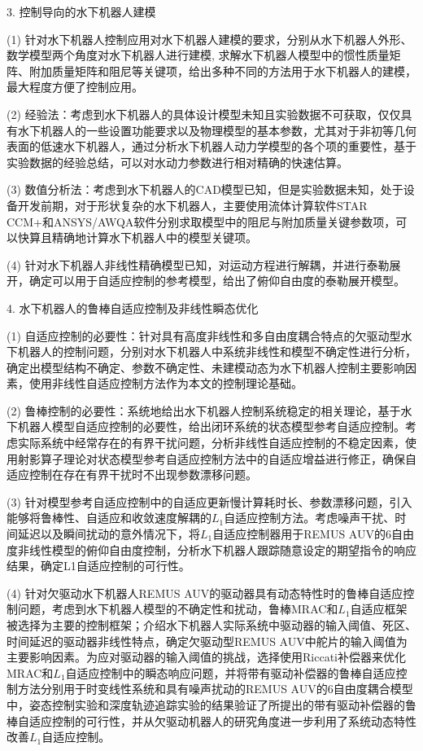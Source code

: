3. 控制导向的水下机器人建模

(1) 针对水下机器人控制应用对水下机器人建模的要求，分别从水下机器人外形、数学模型两个角度对水下机器人进行建模, 求解水下机器人模型中的惯性质量矩阵、附加质量矩阵和阻尼等关键项，给出多种不同的方法用于水下机器人的建模，最大程度方便了控制应用。

(2) 经验法：考虑到水下机器人的具体设计模型未知且实验数据不可获取，仅仅具有水下机器人的一些设置功能要求以及物理模型的基本参数，尤其对于非初等几何表面的低速水下机器人，通过分析水下机器人动力学模型的各个项的重要性，基于实验数据的经验总结，可以对水动力参数进行相对精确的快速估算。

(3) 数值分析法：考虑到水下机器人的CAD模型已知，但是实验数据未知，处于设备开发前期，对于形状复杂的水下机器人，主要使用流体计算软件STAR CCM+和ANSYS/AWQA软件分别求取模型中的阻尼与附加质量关键参数项，可以快算且精确地计算水下机器人中的模型关键项。

(4) 针对水下机器人非线性精确模型已知，对运动方程进行解耦，并进行泰勒展开，确定可以用于自适应控制的参考模型，给出了俯仰自由度的泰勒展开模型。

4. 水下机器人的鲁棒自适应控制及非线性瞬态优化

(1) 自适应控制的必要性：针对具有高度非线性和多自由度耦合特点的欠驱动型水下机器人的控制问题，分别对水下机器人中系统非线性和模型不确定性进行分析，确定出模型结构不确定、参数不确定性、未建模动态为水下机器人控制主要影响因素，使用非线性自适应控制方法作为本文的控制理论基础。

(2) 鲁棒控制的必要性：系统地给出水下机器人控制系统稳定的相关理论，基于水下机器人模型自适应控制的必要性，给出闭环系统的状态模型参考自适应控制。考虑实际系统中经常存在的有界干扰问题，分析非线性自适应控制的不稳定因素，使用射影算子理论对状态模型参考自适应控制方法中的自适应增益进行修正，确保自适应控制在存在有界干扰时不出现参数漂移问题。

(3) 针对模型参考自适应控制中的自适应更新慢计算耗时长、参数漂移问题，引入能够将鲁棒性、自适应和收敛速度解耦的$L_1$自适应控制方法。考虑噪声干扰、时间延迟以及瞬间扰动的意外情况下，将$L_1$自适应控制器用于REMUS AUV的6自由度非线性模型的俯仰自由度控制，分析水下机器人跟踪随意设定的期望指令的响应结果，确定L1自适应控制的可行性。

(4) 针对欠驱动水下机器人REMUS AUV的驱动器具有动态特性时的鲁棒自适应控制问题，考虑到水下机器人模型的不确定性和扰动，鲁棒MRAC和$L_1$自适应框架被选择为主要的控制框架；介绍水下机器人实际系统中驱动器的输入阈值、死区、时间延迟的驱动器非线性特点，确定欠驱动型REMUS AUV中舵片的输入阈值为主要影响因素。为应对驱动器的输入阈值的挑战，选择使用Riccati补偿器来优化MRAC和$L_1$自适应控制中的瞬态响应问题，并将带有驱动补偿器的鲁棒自适应控制方法分别用于时变线性系统和具有噪声扰动的REMUS AUV的6自由度耦合模型中，姿态控制实验和深度轨迹追踪实验的结果验证了所提出的带有驱动补偿器的鲁棒自适应控制的可行性，并从欠驱动机器人的研究角度进一步利用了系统动态特性改善$L_1$自适应控制。



